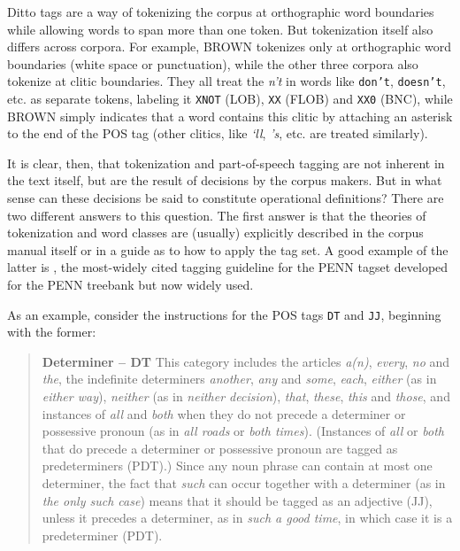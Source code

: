 Ditto tags are a way of tokenizing  the corpus at orthographic word boundaries while allowing words to span  more than one token. But tokenization itself also differs across corpora. For example, BROWN  tokenizes only at orthographic word boundaries (white space or punctuation), while the other three corpora also tokenize at clitic  boundaries. They all treat the \textit{n't} in words like \texttt{don't}, \texttt{doesn't}, etc. as separate tokens, labeling it \texttt{XNOT} (LOB),  \texttt{XX} (FLOB)  and \texttt{XX0} (BNC),  while BROWN  simply indicates that a word contains this clitic  by attaching an asterisk to the end of the POS tag  (other clitics, like \textit{‘ll}, \textit{'s}, etc. are treated similarly).

It is clear, then, that tokenization  and part\hyp{}of\hyp{}speech tagging  are not inherent in the text itself, but are the result of decisions by the corpus makers. But in what sense can these decisions be said to constitute operational  definitions? There are two different answers to this question. The first answer is that the theories of tokenization and word classes are (usually) explicitly described in the corpus manual itself or in a guide as to how to apply the tag set. A good example of the latter is \citet{santorini_part--speech_1990}, the most\hyp{}widely cited tagging  guideline for the PENN tagset developed for the PENN treebank but now widely used.

As an example, consider the instructions for the POS tags \texttt{DT} and \texttt{JJ}, beginning with the former:

\begin{quote}
\textbf{Determiner -- DT}
This category includes the articles \textit{a(n)}, \textit{every}, \textit{no} and \textit{the}, the indefinite determiners \textit{another}, \textit{any} and \textit{some}, \textit{each}, \textit{either} (as in \textit{either way}), \textit{neither} (as in \textit{neither decision}), \textit{that}, \textit{these}, \textit{this} and \textit{those}, and instances of \textit{all} and \textit{both} when they do not precede a determiner  or possessive  pronoun  (as in \textit{all roads} or \textit{both times}). (Instances of \textit{all} or \textit{both} that do precede a determiner or possessive pronoun  are tagged  as predeterminers (PDT).) Since any noun  phrase can contain at most one determiner,  the fact that \textit{such} can occur together with a determiner (as in \textit{the only such case}) means that it should be tagged as an adjective  (JJ), unless it precedes a determiner, as in \textit{such a good time}, in which case it is a predeterminer (PDT). \citep[2]{santorini_part--speech_1990}
\end{quote}

